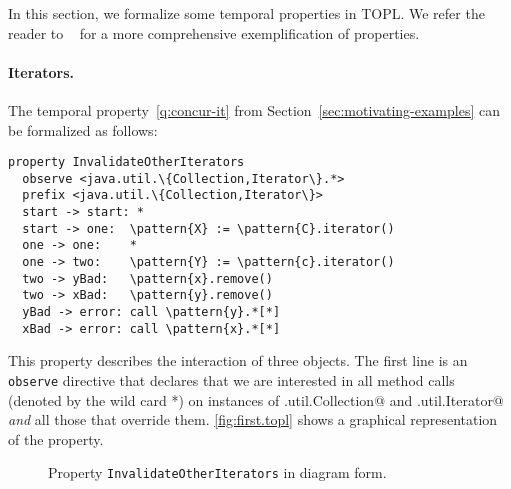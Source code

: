 \documentclass[9pt, preprint]{sigplanconf} %
\newcommand{\delimitVerbatim}{\par\nobreak\smallskip\noindent}
\newcommand{\pattern}[1]{\ensuremath{\mathtt{\underline{#1}}}}
\theoremstyle{definition}
\theoremstyle{remark}
\begin{document}
In this section, we formalize some temporal properties in TOPL. We refer the reader to ~\cite{our-fool2011} for a more comprehensive
exemplification of properties.

\paragraph{Iterators.}
The temporal property~\eqref{q:concur-it} from
Section~\ref{sec:motivating-examples} can be formalized as follows:
{\small
\delimitVerbatim
\begin{Verbatim}[commandchars=\\\{\}]
property InvalidateOtherIterators
  observe <java.util.\{Collection,Iterator\}.*>
  prefix <java.util.\{Collection,Iterator\}>
  start -> start: *
  start -> one:  \pattern{X} := \pattern{C}.iterator()
  one -> one:    *
  one -> two:    \pattern{Y} := \pattern{c}.iterator()
  two -> yBad:   \pattern{x}.remove()
  two -> xBad:   \pattern{y}.remove()
  yBad -> error: call \pattern{y}.*[*]
  xBad -> error: call \pattern{x}.*[*]
\end{Verbatim}
\delimitVerbatim}
This property describes the interaction of three objects.
The first line is an \texttt{observe} directive that declares that we are
interested in all method calls (denoted by the wild card *) on
instances of \Verb@java.util.Collection@ and \Verb@java.util.Iterator@ \emph{and} all those that override them.
\autoref{fig:first.topl} shows a graphical representation of the
property.
%
\begin{figure}[t]
\caption{Property {\tt InvalidateOtherIterators} in diagram form.
}
\label{fig:first.topl}
\end{figure}
\end{document}
